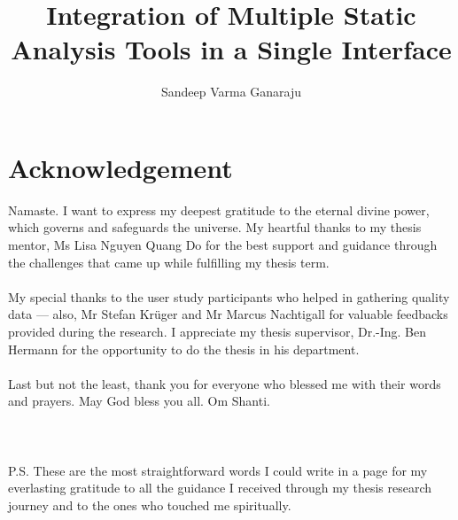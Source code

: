 \documentclass[]{upb_cs_thesis} %
\title{Integration of Multiple Static Analysis Tools in a Single Interface}
\author{Sandeep Varma Ganaraju}
\begin{document}
\let\cleardoublepage\clearpage
\clearpage

\chapter*{Acknowledgement}


\vspace*{\fill}
Namaste. I want to express my deepest gratitude to the eternal divine power, which governs and safeguards the universe. My heartful thanks to my thesis mentor, Ms Lisa Nguyen Quang Do for the best support and guidance through the challenges that came up while fulfilling my thesis term. \\ \\

My special thanks to the user study participants who helped in gathering quality data — also, Mr Stefan Krüger and Mr Marcus Nachtigall for valuable feedbacks provided during the research. I appreciate my thesis supervisor, Dr.-Ing. Ben Hermann for the opportunity to do the thesis in his department. \\ \\

Last but not the least, thank you for everyone who blessed me with their words and prayers. May God bless you all. Om Shanti. \\ \\ \\ \\

\noindent P.S. These are the most straightforward words I could write in a page for my everlasting gratitude to all the guidance I received through my thesis research journey and to the ones who touched me spiritually.
\vspace*{\fill}
%

\clearpage

\vspace*{\fill}
\begin{abstract}
	
\end{abstract}
\acresetall
\vspace*{\fill}
\let\cleardoublepage\clearpage

\tableofcontents %



\end{document}
